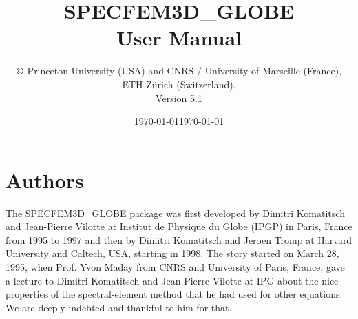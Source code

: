 \documentclass[oneside,english]{book}
\date{\today}
\begin{document}
\thispagestyle{empty}
\begin{center}
\vspace*{-1.8truecm}
\noindent{}
\end{center}
%
\title{\thispagestyle{empty}\textbf{SPECFEM3D\_GLOBE}\\
\textbf{User Manual}}
%
\author{$\copyright$ Princeton University (USA) and CNRS / University of Marseille (France),\\
ETH Z\"urich (Switzerland),\\
Version 5.1}

\date{\noindent \today}

\maketitle

\section*{Authors}
The SPECFEM3D\_GLOBE package was first developed by Dimitri Komatitsch and Jean-Pierre Vilotte at Institut de Physique du Globe (IPGP) in Paris, France
from 1995 to 1997 and then by Dimitri Komatitsch and Jeroen Tromp at Harvard University and Caltech, USA, starting in 1998.
The story started on March 28, 1995, when Prof. Yvon Maday from CNRS and University of Paris, France, gave a lecture to
Dimitri Komatitsch and Jean-Pierre Vilotte at IPG about the nice properties of the spectral-element method that he had used for
other equations. We are deeply indebted and thankful to him for that.
\end{document}
